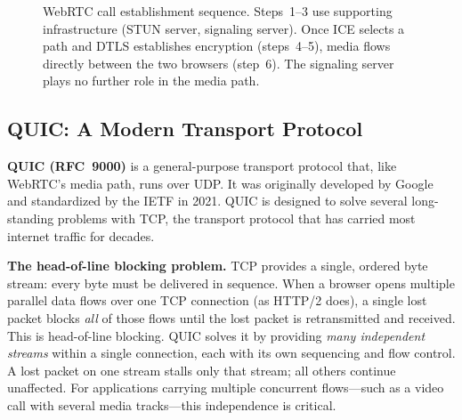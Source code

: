 \documentclass[11pt]{article}
\begin{document}
\begin{figure}[ht]
\caption{WebRTC call establishment sequence.  Steps~1--3 use supporting
  infrastructure (STUN server, signaling server).  Once ICE selects a path
  and DTLS establishes encryption (steps~4--5), media flows directly between
  the two browsers (step~6).  The signaling server plays no further role
  in the media path.}
\label{fig:webrtc-sequence}
\end{figure}

\subsection{QUIC: A Modern Transport Protocol}

\textbf{QUIC (RFC~9000)} is a general-purpose transport protocol that, like
WebRTC's media path, runs over UDP.  It was originally developed by Google
and standardized by the IETF in 2021.  QUIC is designed to solve several
long-standing problems with TCP, the transport protocol that has carried most
internet traffic for decades.

\textbf{The head-of-line blocking problem.}  TCP provides a single,
ordered byte stream: every byte must be delivered in sequence.  When a
browser opens multiple parallel data flows over one TCP connection (as
HTTP/2 does), a single lost packet blocks \emph{all} of those flows until
the lost packet is retransmitted and received.  This is head-of-line
blocking.  QUIC solves it by providing \emph{many independent streams}
within a single connection, each with its own sequencing and flow control.
A lost packet on one stream stalls only that stream; all others continue
unaffected.  For applications carrying multiple concurrent flows---such as
a video call with several media tracks---this independence is critical.
\end{document}
